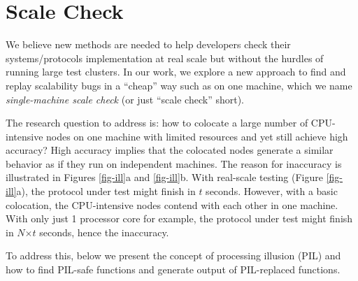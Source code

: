 





\section{Scale Check}
\label{sec-sck}


We believe new methods are needed to help developers check their
systems/protocols implementation at real scale but without the hurdles of
running large test clusters.  
%
In our work, we explore a new approach to find and replay scalability bugs
in a ``cheap'' way such as on one machine, which we name {\em
  single-machine scale check} (or just ``scale check'' short).


The research question to address is: how to colocate a large number of
CPU-intensive nodes on one machine with limited resources and yet still
achieve high accuracy?
%
High accuracy implies that the colocated nodes generate a similar behavior
as if they run on independent machines.
%
The reason for inaccuracy is illustrated in Figures \ref{fig-ill}a
and \ref{fig-ill}b.
%
With real-scale testing (Figure \ref{fig-ill}a), the protocol under test
might finish in $t$ seconds.  However, with a basic colocation, the
CPU-intensive nodes contend with each other in one machine.  With only
just 1 processor core for example, the protocol under test might finish in
$N$$\times$$t$ seconds, hence the inaccuracy.
%

To address this, below we present the concept of processing
illusion (PIL) and how to find PIL-safe functions and generate output of
PIL-replaced functions.







%





